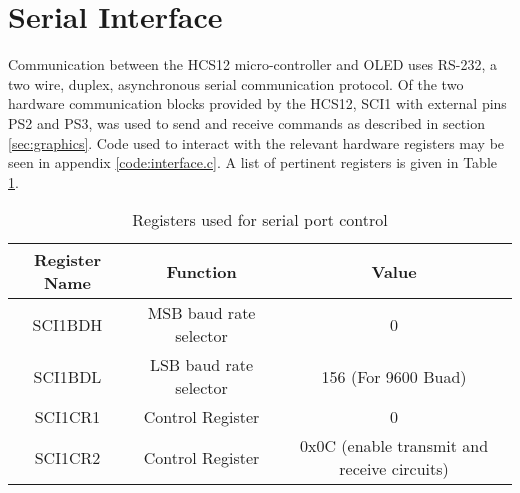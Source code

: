 \section{Serial Interface} 

Communication between the HCS12 micro-controller and OLED uses RS-232, a two wire, duplex, asynchronous serial communication protocol.
Of the two hardware communication blocks provided by the HCS12, SCI1 with external pins PS2 and PS3, was used to send and receive commands as described in section \ref{sec:graphics}.
Code used to interact with the relevant hardware registers may be seen in appendix \ref{code:interface.c}.
A list of pertinent registers is given in Table \ref{tbl:serialregisters}.

\begin{table}[htp]
    \centering
    \caption{Registers used for serial port control}
    \label{tbl:serialregisters}
    \vspace{6pt}
    \begin{tabular}{ccc}
        \toprule
        Register Name & Function & Value \\
        \midrule 
        SCI1BDH & MSB baud rate selector & 0 \\
        SCI1BDL & LSB baud rate selector & 156 (For 9600 Buad) \\
        SCI1CR1 & Control Register & 0 \\
        SCI1CR2 & Control Register & 0x0C (enable transmit and receive circuits) \\
        \bottomrule
    \end{tabular}
\end{table}
